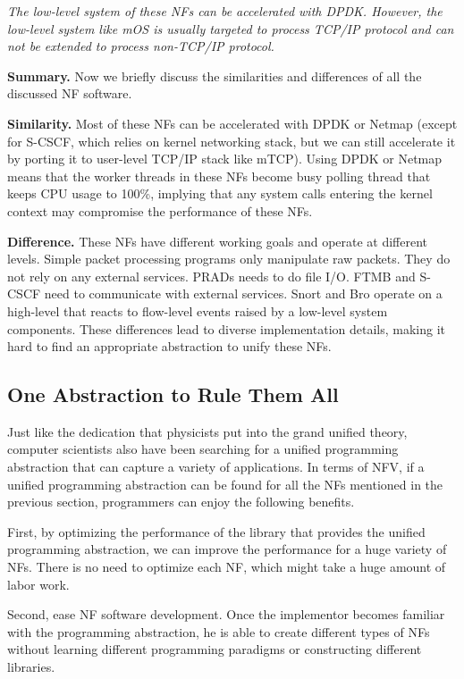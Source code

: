 \textit{The low-level system of these NFs can be accelerated with DPDK. However,
  the low-level system like mOS is usually targeted to process TCP/IP protocol
  and can not be extended to process non-TCP/IP protocol.}

\noindent \textbf{Summary.} Now we briefly discuss the similarities and
differences of all the discussed NF software.

\noindent \textbf{Similarity.} Most of these NFs can be accelerated with DPDK or
Netmap (except for S-CSCF, which relies on kernel networking stack, but we can
still accelerate it by porting it to user-level TCP/IP stack like mTCP). Using
DPDK or Netmap means that the worker threads in these NFs become busy polling
thread that keeps CPU usage to 100\%, implying that any system calls entering
the kernel context may compromise the performance of these NFs.

\noindent \textbf{Difference.} These NFs have different working goals and
operate at different levels. Simple packet processing programs only manipulate
raw packets. They do not rely on any external services. PRADs needs to do file
I/O. FTMB and S-CSCF need to communicate with external services. Snort and Bro
operate on a high-level that reacts to flow-level events raised by a low-level
system components. These differences lead to diverse implementation details,
making it hard to find an appropriate abstraction to unify these NFs. 

\subsection{One Abstraction to Rule Them All}

Just like the dedication that physicists put into the grand unified theory,
computer scientists also have been searching for a unified programming
abstraction that can capture a variety of applications. In terms of NFV, if a
unified programming abstraction can be found for all the NFs mentioned in
the previous section, programmers can enjoy the following benefits.

First, by optimizing the performance of the library that provides the
unified programming abstraction, we can improve the performance for a huge variety of
NFs. There is no need to optimize each NF, which might take a huge amount of
labor work.

Second, ease NF software development. Once the implementor becomes familiar with
the programming abstraction, he is able to create different types of NFs without
learning different programming paradigms or constructing different libraries.

